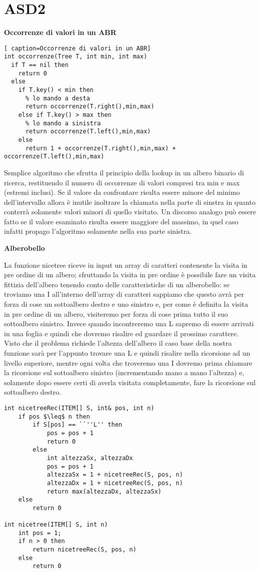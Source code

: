 \documentclass[../cheatSheetAlgoritmi.tex]{subfiles}
\begin{document}
\section{ASD2}
\textbf{Occorrenze di valori in un ABR}
\begin{lstlisting}[ caption=Occorrenze di valori in un ABR]
int occorrenze(Tree T, int min, int max)
  if T == nil then
    return 0
  else
    if T.key() < min then 
      % lo mando a desta
      return occorrenze(T.right(),min,max)
    else if T.key() > max then 
      % lo mando a sinistra
      return occorrenze(T.left(),min,max)
    else
      return 1 + occorrenze(T.right(),min,max) + occorrenze(T.left(),min,max)
\end{lstlisting}
Semplice algoritmo che sfrutta il principio della lookup in un albero binario di ricerca, restituendo il numero di occorrenze di valori compresi tra min e max (estremi inclusi). 
Se il valore da confrontare risulta essere minore del minimo dell'intervallo allora è inutile inoltrare la chiamata nella parte di sinstra in quanto conterrà solamente valori minori di quello visitato. Un discorso analogo può essere fatto se il valore esaminato risulta essere maggiore del massimo, in quel caso infatti propago l'algoritmo solamente nella sua parte sinistra.

\bigskip

\textbf{Alberobello}

La funzione nicetree riceve in input un array di caratteri contenente la visita in pre ordine di un albero; sfruttando la visita in pre ordine è possibile fare un visita fittizia dell'albero tenendo conto delle caratteristiche di un alberobello: se troviamo una I all'interno dell'array di caratteri sappiamo che questo avrà per forza di cose un sottoalbero destro e uno sinistro e, per come è definita la visita in pre ordine di un albero, visiteremo per forza di cose prima tutto il suo sottoalbero sinistro. Invece quando incontreremo una L sapremo di essere arrivati in una foglia e quindi che dovremo risalire ed guardare il prossimo carattere. Visto che il problema richiede l'altezza dell'albero il caso base della nostra funzione sarà per l'appunto trovare una L e quindi risalire nella ricorsione ad un livello superiore, mentre ogni volta che troveremo una I dovremo prima chiamare la ricorsione sul sottoalbero sinistro (incrementando mano a mano l'altezza) e, solamente dopo essere certi di averla visitata completamente, fare la ricorsione sul sottoalbero destro.
 
\begin{lstlisting}[caption=Alberobello]
int nicetreeRec(ITEM[] S, int& pos, int n)
	if pos $\leq$ n then
    	if S[pos] == ``''L'' then
      		pos = pos + 1
      		return 0
    	else
      		int altezzaSx, altezzaDx
      		pos = pos + 1
      		altezzaSx = 1 + nicetreeRec(S, pos, n)
      		altezzaDx = 1 + nicetreeRec(S, pos, n)
      		return max(altezzaDx, altezzaSx)
  	else
    	return 0
    
int nicetree(ITEM[] S, int n)
	int pos = 1;
  	if n > 0 then
    	return nicetreeRec(S, pos, n)
  	else
    	return 0
\end{lstlisting}
\end{document}

